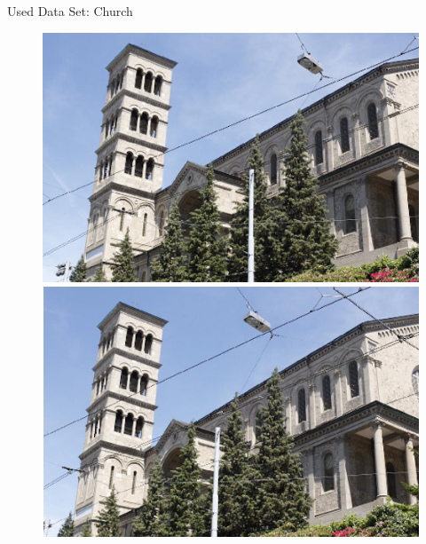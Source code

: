 \begin{frame}{Used Data Set: Church}
\begin{figure}[!tbp]
  \centering
  \begin{minipage}[b]{0.49\textwidth}
    \includegraphics[width=\textwidth]{./images/first_frame_church.png}
  \end{minipage}
	\pause
  \begin{minipage}[b]{0.5\textwidth}
    \includegraphics[width=\textwidth]{./images/last_frame_church.png}
  \end{minipage}
\end{figure}
\end{frame}


